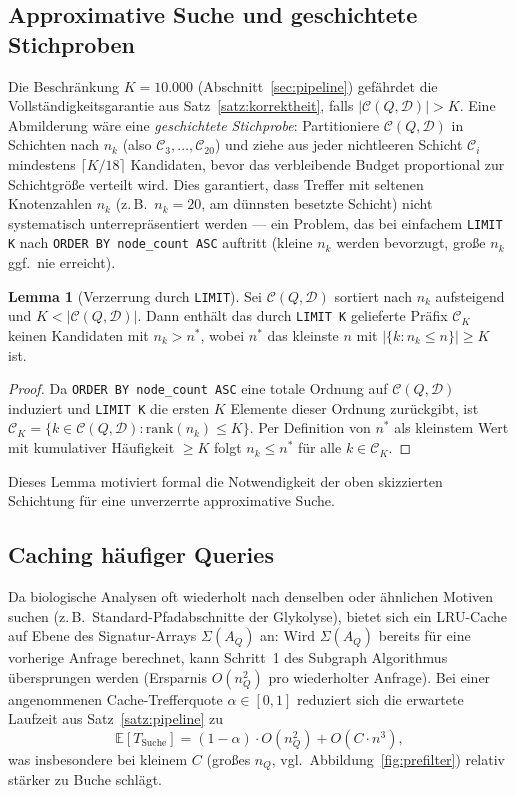 \documentclass[a4paper,12pt, twoside]{report}
\theoremstyle{definition}
\newtheorem{lemma}{Lemma}
\begin{document}
\subsection{Approximative Suche und geschichtete Stichproben}

Die Beschränkung $K=10.000$ (Abschnitt~\ref{sec:pipeline}) gefährdet die Vollständigkeitsgarantie aus Satz~\ref{satz:korrektheit}, falls $|\mathcal{C}(Q,\mathcal{D})|>K$. Eine Abmilderung wäre eine \emph{geschichtete Stichprobe}: Partitioniere $\mathcal{C}(Q,\mathcal{D})$ in Schichten nach $n_k$ (also $\mathcal{C}_3,\ldots,\mathcal{C}_{20}$) und ziehe aus jeder nichtleeren Schicht $\mathcal{C}_i$ mindestens $\lceil K/18\rceil$ Kandidaten, bevor das verbleibende Budget proportional zur Schichtgröße verteilt wird. Dies garantiert, dass Treffer mit seltenen Knotenzahlen $n_k$ (z.\,B.\ $n_k=20$, am dünnsten besetzte Schicht) nicht systematisch unterrepräsentiert werden — ein Problem, das bei einfachem \texttt{LIMIT K} nach \texttt{ORDER BY node\_count ASC} auftritt (kleine $n_k$ werden bevorzugt, große $n_k$ ggf.\ nie erreicht).

\begin{lemma}[Verzerrung durch \texttt{LIMIT}]
	Sei $\mathcal{C}(Q,\mathcal{D})$ sortiert nach $n_k$ aufsteigend und $K < |\mathcal{C}(Q,\mathcal{D})|$. Dann enthält das durch \texttt{LIMIT K} gelieferte Präfix $\mathcal{C}_K$ keinen Kandidaten mit $n_k > n^*$, wobei $n^*$ das kleinste $n$ mit $|\{k:n_k\le n\}|\ge K$ ist.
\end{lemma}

\begin{proof}
	Da \texttt{ORDER BY node\_count ASC} eine totale Ordnung auf $\mathcal{C}(Q,\mathcal{D})$ induziert und \texttt{LIMIT K} die ersten $K$ Elemente dieser Ordnung zurückgibt, ist $\mathcal{C}_K = \{k\in\mathcal{C}(Q,\mathcal{D}): \mathrm{rank}(n_k)\le K\}$. Per Definition von $n^*$ als kleinstem Wert mit kumulativer Häufigkeit $\ge K$ folgt $n_k \le n^*$ für alle $k\in\mathcal{C}_K$.
\end{proof}

Dieses Lemma motiviert formal die Notwendigkeit der oben skizzierten Schichtung für eine unverzerrte approximative Suche.


\subsection{Caching häufiger Queries}

Da biologische Analysen oft wiederholt nach denselben oder ähnlichen Motiven suchen (z.\,B.\ Standard-Pfadabschnitte der Glykolyse), bietet sich ein LRU-Cache auf Ebene des Signatur-Arrays $\Sigma(A_Q)$ an: Wird $\Sigma(A_Q)$ bereits für eine vorherige Anfrage berechnet, kann Schritt~1 des Subgraph Algorithmus übersprungen werden (Ersparnis $O(n_Q^2)$ pro wiederholter Anfrage). Bei einer angenommenen Cache-Trefferquote $\alpha\in[0,1]$ reduziert sich die erwartete Laufzeit aus Satz~\ref{satz:pipeline} zu
\[
\mathbb{E}[T_{\text{Suche}}] = (1-\alpha)\cdot O(n_Q^2) + O(C\cdot n^3),
\]
was insbesondere bei kleinem $C$ (großes $n_Q$, vgl.\ Abbildung~\ref{fig:prefilter}) relativ stärker zu Buche schlägt.
\end{document}
